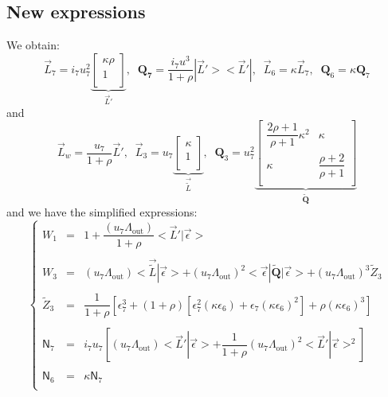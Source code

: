 \documentclass[aps,onecolumn,11pt]{revtex4}
\newcommand{\myout}[1]{{#1}_{\mathrm{out}}}
\newcommand{\mymat}[1]{{\bm{#1}}}
\newcommand{\LiAll}{\Lambda}
\newcommand{\LiAllOut}{\myout{\LiAll}}
\begin{document}
\subsection{New expressions}
We obtain:
\begin{equation}
\vec{L}_7 = i_7 u_7^2 
\underbrace{
\begin{bmatrix}
	\kappa \rho \\
	1\\
\end{bmatrix}}_{\vec{L}'} ,\;\;
\mymat{Q_7} = \dfrac{i_7u^3}{1+\rho} |\vec{L}'><\vec{L}'|,\;\; \vec{L}_6 = \kappa \vec{L}_7, \;\; \mymat{Q}_6 = \kappa \mymat{Q}_7
\end{equation}
and
\begin{equation}
	\vec{L}_w = \dfrac{u_7}{1+\rho} \vec{L}',\;\;
	\vec{L}_3 = u_7 \underbrace{\begin{bmatrix} \kappa \\ 1 \\ \end{bmatrix}}_{\vec{\tilde{L}}},\;\;
	\mymat{Q}_3 = u_7^2
	\underbrace{ 
	\begin{bmatrix}
	\dfrac{2\rho+1}{\rho+1} \kappa^2 & \kappa \\
	\kappa & \dfrac{\rho+2}{\rho+1}\\
	\end{bmatrix}
	}_{\mymat{\tilde{Q}}}
\end{equation}
and we have the simplified expressions:
\begin{equation}
\left\lbrace
\begin{array}{rcl}
W_1 & = & 1 + \dfrac{\left(u_7\LiAllOut\right)}{1+\rho} <\vec{L}'|\vec{\epsilon}>\\
\\
W_3 & = & \left(u_7\LiAllOut\right) <\vec{\tilde{L}}|\vec{\epsilon}> + \left(u_7\LiAllOut\right)^2 <\vec{\epsilon}|\mymat{\tilde{Q}}|\vec{\epsilon}> + \left(u_7\LiAllOut\right)^3 \tilde{Z}_3\\
\\
\tilde{Z}_3 & = & \dfrac{1}{1+\rho} \left[ \epsilon_7^3 + (1+\rho) \left[ \epsilon_7^2\left(\kappa\epsilon_6\right) +  \epsilon_7\left(\kappa\epsilon_6\right)^2 \right]+ \rho \left(\kappa \epsilon_6\right)^3\right] \\
\\
\mathsf{N}_7 & = & i_7 u_7  \left[ \left(u_7\LiAllOut\right) <\vec{L}'|\vec{\epsilon}> + \dfrac{1}{1+\rho} \left(u_7\LiAllOut\right)^2 <\vec{L}'|\vec{\epsilon}>^2 \right]\\
\\
\mathsf{N}_6 & = & \kappa \mathsf{N}_7\\
\end{array}
\right.
\end{equation}
\end{document}
